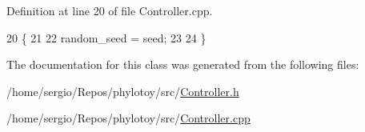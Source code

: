 Definition at line 20 of file Controller.\+cpp.


\begin{DoxyCode}
20                                        \{
21   
22   random\_seed = seed;
23   
24 \}
\end{DoxyCode}


The documentation for this class was generated from the following files\+:\begin{DoxyCompactItemize}
\item 
/home/sergio/\+Repos/phylotoy/src/\hyperlink{Controller_8h}{Controller.\+h}\item 
/home/sergio/\+Repos/phylotoy/src/\hyperlink{Controller_8cpp}{Controller.\+cpp}\end{DoxyCompactItemize}
